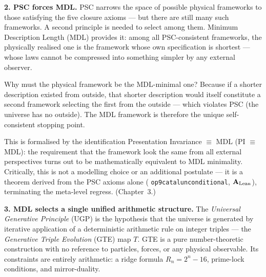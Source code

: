 \documentclass[11pt,openany]{book}
\theoremstyle{remark}
\newcommand{\lean}[1]{%
  \penalty-100
  \begingroup\def\_{\textunderscore\allowbreak}\texttt{#1}\endgroup}
\newcommand{\CatAL}{\ensuremath{\textbf{A}_{\rm Lean}}}
\begin{document}
\medskip

\textbf{2. PSC forces MDL.}
PSC narrows the space of possible physical frameworks to those satisfying the
five closure axioms --- but there are still many such frameworks.
A second principle is needed to select among them.
Minimum Description Length (MDL) provides it: among all PSC-consistent
frameworks, the physically realised one is the framework whose own
specification is shortest --- whose laws cannot be compressed into something
simpler by any external observer.

Why must the physical framework be the MDL-minimal one?
Because if a shorter description existed from outside, that shorter
description would itself constitute a second framework selecting the
first from the outside --- which violates PSC (the universe has no outside).
The MDL framework is therefore the unique self-consistent stopping point.

This is formalised by the identification Presentation Invariance $\equiv$ MDL
(PI $\equiv$ MDL): the requirement that the framework look the same from all
external perspectives turns out to be mathematically equivalent to MDL
minimality.
Critically, this is not a modelling choice or an additional postulate ---
it is a theorem derived from the PSC axioms alone (\lean{op9\_catal\_unconditional},
\CatAL), terminating the meta-level regress.
(Chapter~3.)

\medskip

\textbf{3. MDL selects a single unified arithmetic structure.}
The \emph{Universal Generative Principle} (UGP) is the hypothesis that the
universe is generated by iterative application of a deterministic arithmetic
rule on integer triples --- the \emph{Generative Triple Evolution} (GTE) map
$T$.
GTE is a pure number-theoretic construction with no reference to particles,
forces, or any physical observable.
Its constraints are entirely arithmetic: a ridge formula $R_n = 2^n-16$,
prime-lock conditions, and mirror-duality.
\end{document}
